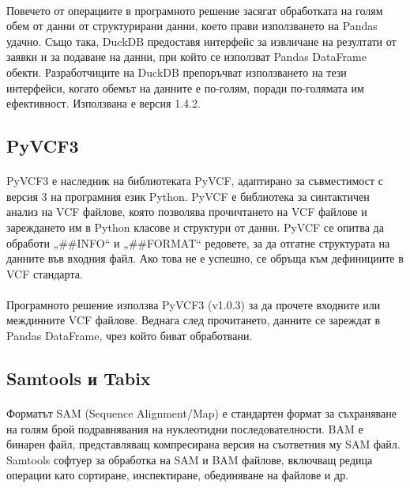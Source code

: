 \documentclass[pdftex,cyrillic,14pt,a4page,twoside,openright]{extreport}
\begin{document}
\paragraph{}
Повечето от операциите в програмното решение засягат обработката на голям обем от данни от структурирани данни, което прави използването на Pandas удачно. Също така, DuckDB предоставя интерфейс за извличане на резултати от заявки и за подаване на данни, при който се използват Pandas DataFrame обекти. Разработчиците на DuckDB препоръчват използването на тези интерфейси, когато обемът на данните е по-голям, поради по-голямата им ефективност. Използвана е версия 1.4.2.

\subsection{PyVCF3}
\paragraph{}
PyVCF3 \cite{pyvcf3} е наследник на библиотеката PyVCF, адаптирано за съвместимост с версия 3 на програмния език Python. PyVCF е библиотека за синтактичен анализ на VCF файлове, която позволява прочичтането на VCF файлове и зареждането им в Python класове и структури от данни. PyVCF се опитва да обработи „\#\#INFO“ и „\#\#FORMAT“ редовете, за да отгатне структурата на данните във входния файл. Ако това не е успешно, се обръща към дефинициите в VCF стандарта.

\paragraph{}
Програмното решение използва PyVCF3 (v1.0.3) за да прочете входните или междинните VCF файлове. Веднага след прочитането, данните се зареждат в Pandas DataFrame, чрез който биват обработвани.

\subsection{Samtools и Tabix}\label{sec:samtools_tabix}
\paragraph{}
Форматът SAM (Sequence Alignment/Map) е стандартен формат за съхраняване на голям брой подравнявания на нуклеотидни последователности. BAM е бинарен файл, представляващ компресирана версия на съответния му SAM файл. Samtools \cite{li2009} софтуер за обработка на SAM и BAM файлове, включващ редица операции като сортиране, инспектиране, обединяване на файлове и др.
\end{document}
